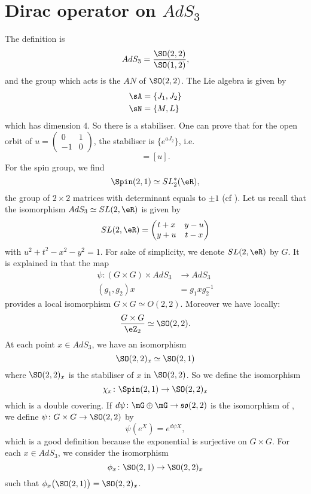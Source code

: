 
\section{Dirac operator on \texorpdfstring{$AdS_{3}$}{AdS3}}  \label{PgDiracAdSTrois}

The definition is
\[
	AdS_{3}=\frac{ \SO(2,2) }{ \SO(1,2) },
\]
and the group which acts is the $AN$ of $\SO(2,2)$. The Lie algebra is given by
\[
	\begin{split}
		\sA&=\{ J_{1},J_{2} \}\\
		\sN&=\{ M,L \}
	\end{split}
\]
which has dimension $4$. So there is a stabiliser. One can prove that for the open orbit of $u=\begin{pmatrix}
		0 & 1 \\-1&0
	\end{pmatrix}$, the stabiliser is $\{  e^{aJ_{2}} \}$, i.e.
\begin{equation}
	[ e^{aJ_{2}}u]=[u].
\end{equation}
For the spin group, we find
\[
	\Spin(2,1)\simeq SL_2^*(\eR),
\]
the group of $2\times 2$ matrices with determinant equals to $\pm 1$ (cf \cite{Michelson}). Let us recall that the isomorphism $AdS_{3}\simeq SL(2,\eR)$ is given by
\[
	SL(2,\eR)=\begin{pmatrix}
		t+x & y-u \\
		y+u & t-x
	\end{pmatrix}
\]
with $u^{2}+t^{2}-x^{2}-y^{2}=1$. For sake of simplicity, we denote $SL(2,\eR)$ by $G$. It is explained in \cite{Clement} that the map
\begin{equation}
	\begin{aligned}
		\psi\colon (G\times G)\times AdS_{3} & \to AdS_3          \\
		(g_{1},g_{2})x                       & = g_{1}xg_{2}^{-1}
	\end{aligned}
\end{equation}
provides a local isomorphism $G\times G\simeq O(2,2)$. Moreover we have locally:
\[
	\frac{ G\times G }{ \eZ_{2} }\simeq \SO(2,2).
\]
At each point $x\in AdS_3$, we have an isomorphism
\[
	\SO(2,2)_{x}\simeq \SO(2,1)
\]
where $\SO(2,2)_{x}$ is the stabiliser of $x$ in $\SO(2,2)$. So we define the isomorphism
\[
	\chi_{x}\colon \Spin(2,1)\to \SO(2,2)_{x}
\]
which is a double covering. If $d\psi\colon \mG\oplus\mG\to \mathfrak{so}(2,2)$ is the isomorphism of \cite{Clement}, we define $\psi\colon G\times G\to \SO(2,2)$ by
\[
	\psi( e^{X})= e^{d\psi X},
\]
which is a good definition because the exponential is surjective on $G\times G$. For each $x\in AdS_3$, we consider the isomorphism
\[
	\phi_{x}\colon \SO(2,1)\to \SO(2,2)_{x}
\]
such that $\phi_{x}\big( \SO(2,1) \big)=\SO(2,2)_{x}$.

